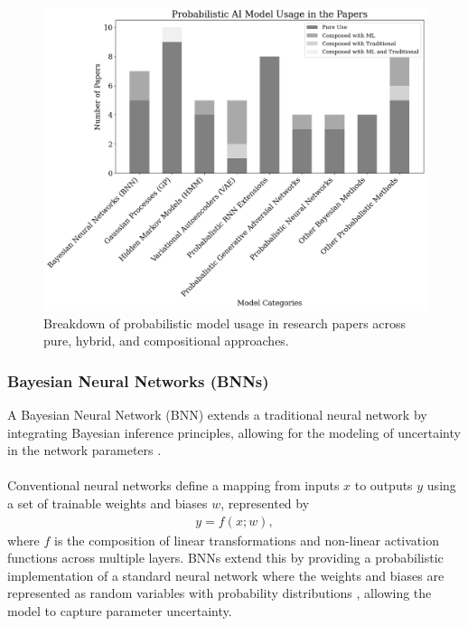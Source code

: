 \begin{figure}[H]
    \centering    \includegraphics[width=1\linewidth]{Images/model_breakdown.png}
    \caption{Breakdown of probabilistic model usage in research papers across pure, hybrid, and compositional approaches.}
    \label{fig:model_breakdown}
\end{figure}


\subsubsection{Bayesian Neural Networks (BNNs)}
\label{sec:bnn}

A Bayesian Neural Network (BNN) extends a traditional neural network by integrating Bayesian inference principles, allowing for the modeling of uncertainty in the network parameters \parencite{neal1995bayesian}. 
\\
\\
Conventional neural networks define a mapping from inputs $x$ to outputs $y$ using a set of trainable weights and biases $w$, represented by
\begin{equation}
    \begin{gathered}
        y = f(x;w),
    \end{gathered}
\end{equation}
where $f$ is the composition of linear transformations and non-linear activation functions across multiple layers. BNNs extend this by providing a probabilistic implementation of a standard neural network where the weights and biases are represented as random variables with probability distributions \parencite{chandra2023bayesian}, allowing the model to capture parameter uncertainty. 

